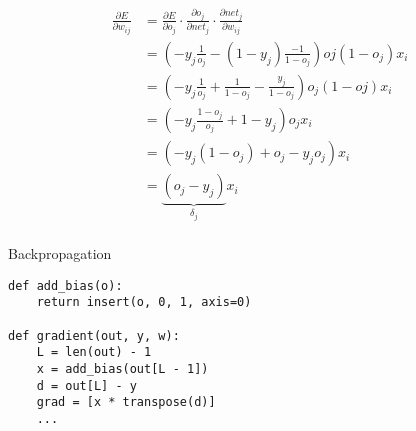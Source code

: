 \begin{frame}
  \begin{equation*}
    \begin{split}
      \frac{\partial E}{\partial w_{ij}} & = \frac{\partial E}{\partial o_j}
    \cdot \frac{\partial o_j}{\partial net_j} \cdot \frac{\partial
    net_j}{\partial w_{ij}} \\
    & = (-y_j \frac{1}{o_j} - (1 - y_j) \frac{-1}{1 - o_j}) oj(1 - o_j) x_i \\
    & = (-y_j \frac{1}{o_j} + \frac{1}{1 - o_j} - \frac{y_j}{1 - o_j}) o_j(1 - oj) x_i \\
    & = (-y_j \frac{1 - o_j}{o_j} + 1 - y_j) o_j x_i \\
    & = (-y_j (1 - o_j) + o_j - y_j o_j) x_i \\
    & = \underbrace{(o_j - y_j)}_{\delta_j} x_i \\
  \end{split}
\end{equation*}
\end{frame}

\begin{frame}[fragile]
  \begin{block}{Backpropagation}
    \begin{lstlisting}
def add_bias(o):
    return insert(o, 0, 1, axis=0)

def gradient(out, y, w):
    L = len(out) - 1
    x = add_bias(out[L - 1])
    d = out[L] - y
    grad = [x * transpose(d)]
    ...
    \end{lstlisting}
  \end{block}
\end{frame}

